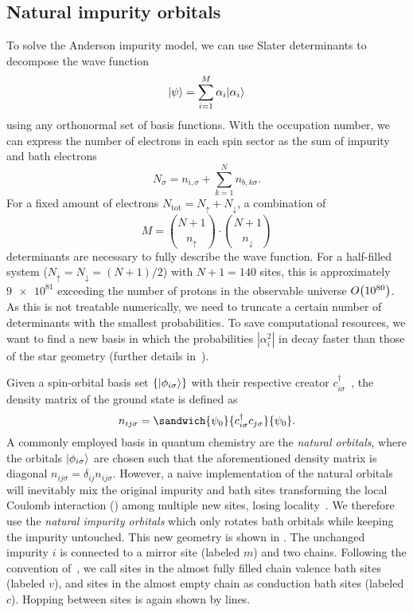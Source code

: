 \subsection{Natural impurity orbitals}%
\label{sec:natural-impurity-orbitals}

To solve the Anderson impurity model,
we can use Slater determinants to decompose the wave function
\begin{equation}
    \lvert\psi\rangle = \sum_{i=1}^M \alpha_i \lvert\alpha_i\rangle
    \label{eq:slater-decomposition}
\end{equation}
using any orthonormal set of basis functions.
With the occupation number,
we can express the number of electrons in each spin sector as
the sum of impurity and bath electrons
\begin{equation}
    N_\sigma = n_{i,\sigma} + \sum_{k=1}^N n_{b,k\sigma}.
\end{equation}
For a fixed amount of electrons $N_\mathrm{tot} = N_\uparrow + N_\downarrow$,
a combination of
\begin{equation}
    M = \binom{N+1}{n_\uparrow} \cdot \binom{N+1}{n_\downarrow}
\end{equation}
determinants are necessary to fully describe the wave function.
For a half-filled system ($N_\uparrow = N_\downarrow = (N+1)/2$)
with $N+1=140$ sites, this is approximately $\num{9e81}$
exceeding the number of protons in the observable universe $O\!\left(\num{e80}\right)$. %
As this is not treatable numerically,
we need to truncate a certain number of determinants with the smallest probabilities.
To save computational resources,
we want to find a new basis in which the probabilities
$|\alpha_i^2|$ in 
decay faster than those of the star geometry
(further details in~\cite{Bi2019}).

Given a spin-orbital basis set $\{\lvert\phi_{i\sigma}\rangle\}$
with their respective creator $c_{i\sigma}^\dag$~\cite{Bi2019},
the density matrix of the ground state is defined as
\begin{equation}
    n_{ij\sigma} = \sandwich{\psi_0}{c_{i\sigma}^\dag c_{j\sigma}}{\psi_0}.
\end{equation}
A commonly employed basis in quantum chemistry are the \emph{natural orbitals},
where the orbitals $\lvert\phi_{i\sigma}\rangle$ are chosen such that
the aforementioned density matrix is diagonal $n_{ij\sigma} = \delta_{ij}n_{ij\sigma}$.
However,
a naive implementation of the natural orbitals will inevitably mix the original impurity
and bath sites transforming the local Coulomb interaction ()
among multiple new sites,
losing locality~\cite{Lu2014,Lu2019}.
We therefore use the \emph{natural impurity orbitals}
which only rotates bath orbitals while keeping the impurity untouched.
This new geometry is shown in .
The unchanged impurity $i$ is connected to a mirror site (labeled $m$) and two chains.
Following the convention of~\cite{Lu2014,Lu2019},
we call sites in the almost fully filled chain valence bath sites (labeled $v$),
and sites in the almost empty chain as conduction bath sites (labeled $c$).
Hopping between sites is again shown by lines.

